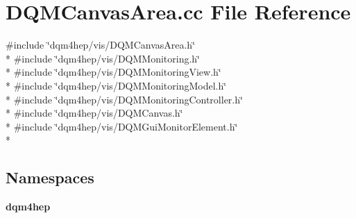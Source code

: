 \section{D\+Q\+M\+Canvas\+Area.\+cc File Reference}
\label{DQMCanvasArea_8cc}
{\ttfamily \#include \char`\"{}dqm4hep/vis/\+D\+Q\+M\+Canvas\+Area.\+h\char`\"{}}\\*
{\ttfamily \#include \char`\"{}dqm4hep/vis/\+D\+Q\+M\+Monitoring.\+h\char`\"{}}\\*
{\ttfamily \#include \char`\"{}dqm4hep/vis/\+D\+Q\+M\+Monitoring\+View.\+h\char`\"{}}\\*
{\ttfamily \#include \char`\"{}dqm4hep/vis/\+D\+Q\+M\+Monitoring\+Model.\+h\char`\"{}}\\*
{\ttfamily \#include \char`\"{}dqm4hep/vis/\+D\+Q\+M\+Monitoring\+Controller.\+h\char`\"{}}\\*
{\ttfamily \#include \char`\"{}dqm4hep/vis/\+D\+Q\+M\+Canvas.\+h\char`\"{}}\\*
{\ttfamily \#include \char`\"{}dqm4hep/vis/\+D\+Q\+M\+Gui\+Monitor\+Element.\+h\char`\"{}}\\*
\subsection*{Namespaces}
\begin{DoxyCompactItemize}
\item 
 {\bf dqm4hep}
\end{DoxyCompactItemize}
